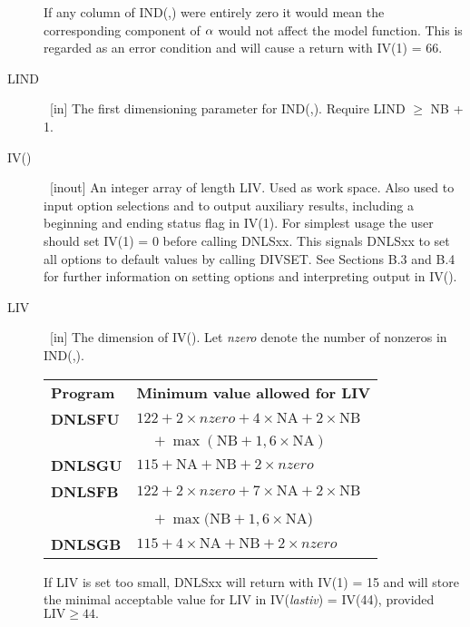 \documentclass[twoside]{MATH77}
\begin{document}
\begin{description}
If any column of IND(,) were entirely zero it would mean the corresponding
component of ${\bf \alpha }$ would not affect the model function. This is
regarded as an error condition and will cause a return with IV(1) = 66.

\item[LIND]  \ [in] The first dimensioning parameter for IND(,). Require LIND
$\geq $ NB + 1.

\item[IV()]  \ [inout] An integer array of length LIV. Used as work space.
Also used to input option selections and to output auxiliary results,
including a beginning and ending status flag in IV(1). For simplest usage
the user should set IV(1) = 0 before calling DNLSxx. This signals DNLSxx to
set all options to default values by calling DIVSET. See Sections B.3 and
B.4 for further information on setting options and interpreting output in
IV().

\item[LIV]  \ [in] The dimension of IV(). Let {\em nzero} denote the number of
nonzeros in IND(,).
\begin{tabular}{@{}l@{\ \ }l}
\bf Program & \multicolumn{1}{c}{\bf Minimum value allowed for LIV}\\
\bf DNLSFU &  $122+2\times nzero+4\times \text{NA}+2\times \text{NB}$\\
 & $\quad + \max (\text{NB}+1,6\times \text{NA})$\\
\bf DNLSGU & $115+\text{NA}+\text{NB}+2\times nzero$\\
\bf DNLSFB & $122+2\times nzero+7\times \text{NA}+2\times \text{NB}$\\
 & $\quad + \max (\text{NB}+1,6\times \text{NA}$)\\
\bf DNLSGB & $115+4\times \text{NA}+\text{NB}+2\times nzero$\\
\end{tabular}
If LIV is set too small, DNLSxx will return with IV(1) = 15 and will store
the minimal acceptable value for LIV in IV({\em lastiv}) = IV(44),
provided $\text{LIV} \geq 44.$


\end{description}
\end{document}
